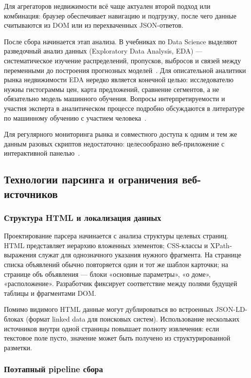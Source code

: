 Для агрегаторов недвижимости всё чаще актуален второй подход или комбинация: браузер обеспечивает навигацию и подгрузку, после чего данные считываются из DOM или из перехваченных JSON-ответов.

После сбора начинается этап анализа. В учебниках по Data Science выделяют разведочный анализ данных (Exploratory Data Analysis, EDA) --- систематическое изучение распределений, пропусков, выбросов и связей между переменными до построения прогнозных моделей~\cite{demidova2022,grus2021}. Для описательной аналитики рынка недвижимости EDA нередко является конечной целью: исследователю нужны гистограммы цен, карта предложений, сравнение сегментов, а не обязательно модель машинного обучения. Вопросы интерпретируемости и участия эксперта в аналитическом процессе подробно обсуждаются в литературе по машинному обучению с участием человека~\cite{monarch2022}.

Для регулярного мониторинга рынка и совместного доступа к одним и тем же данным разовых скриптов недостаточно: целесообразно веб-приложение с интерактивной панелью~\cite{filimonova2024,sultanov2022}.

\subsection{Технологии парсинга и ограничения веб-источников}

\subsubsection{Структура HTML и локализация данных}

Проектирование парсера начинается с анализа структуры целевых страниц. HTML представляет иерархию вложенных элементов; CSS-классы и XPath-выражения служат для однозначного указания нужного фрагмента. На странице списка объявлений обычно повторяется один и тот же шаблон карточки; на странице объ объявления --- блоки «основные параметры», «о доме», «расположение». Разработчик фиксирует соответствие между полями будущей таблицы и фрагментами DOM.

Помимо видимого HTML данные могут дублироваться во встроенных JSON-LD-блоках (формат linked data для поисковых систем). Использование нескольких источников внутри одной страницы повышает полноту извлечения: если текстовое поле пусто, значение может быть получено из структурированной разметки.

\subsubsection{Поэтапный pipeline сбора}

